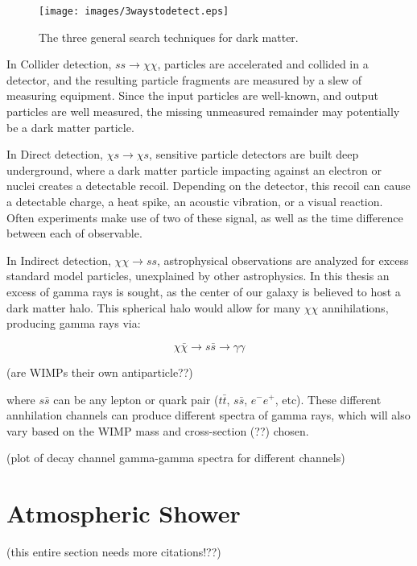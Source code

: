 \begin{figure}[ht]
  \begin{center}
    \texttt{[image: images/3waystodetect.eps]}
    \caption[3 Search Techniques]{The three general search techniques for dark matter.}\label{fig:3_searches}
  \end{center}
\end{figure}

In Collider detection, $ss \rightarrow \chi\chi$, particles are accelerated and collided in a detector, and the resulting particle fragments are measured by a slew of measuring equipment.
Since the input particles are well-known, and output particles are well measured, the missing unmeasured remainder may potentially be a dark matter particle.

In Direct detection, $\chi s \rightarrow \chi s$, sensitive particle detectors are built deep underground, where a dark matter particle impacting against an electron or nuclei creates a detectable recoil.
Depending on the detector, this recoil can cause a detectable charge, a heat spike, an acoustic vibration, or a visual reaction.
Often experiments make use of two of these signal, as well as the time difference between each of observable.

In Indirect detection, $\chi\chi \rightarrow ss$, astrophysical observations are analyzed for excess standard model particles, unexplained by other astrophysics.
In this thesis an excess of gamma rays is sought, as the center of our galaxy is believed to host a dark matter halo.
This spherical halo would allow for many $\chi\chi$ annihilations, producing gamma rays via: 

$$\chi\bar{\chi} \rightarrow s\bar{s} \rightarrow \gamma\gamma$$

(are WIMPs their own antiparticle??)

where $s\bar{s}$ can be any lepton or quark pair ($t\bar{t}$, $s\bar{s}$, $e^{-}e^{+}$, etc).
These different annhilation channels can produce different spectra of gamma rays, which will also vary based on the WIMP mass and cross-section (??) chosen.

(plot of decay channel gamma-gamma spectra for different channels)



\section{Atmospheric Shower}
(this entire section needs more citations!??)

